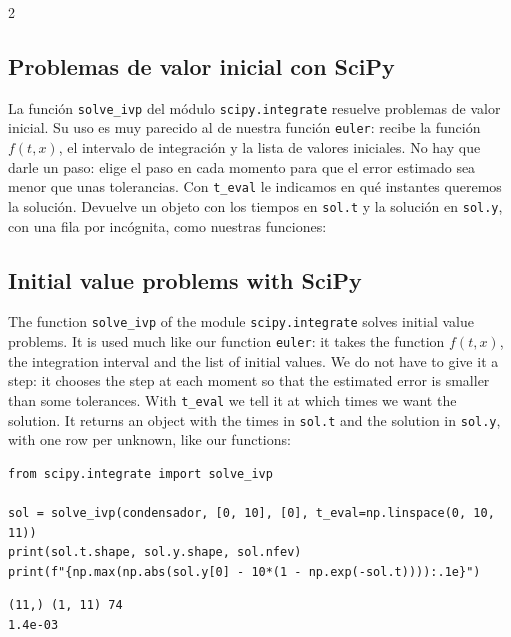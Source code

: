 \begin{paracol}{2}
\subsection{Problemas de valor inicial con SciPy}\label{sec:solve_ivp}
La función \texttt{solve_ivp} del módulo \texttt{scipy.integrate} resuelve problemas de valor inicial. Su uso es muy parecido al de nuestra función \texttt{euler}: recibe la función $f(t,x)$, el intervalo de integración y la lista de valores iniciales. No hay que darle un paso: elige el paso en cada momento para que el error estimado sea menor que unas tolerancias. Con \texttt{t_eval} le indicamos en qué instantes queremos la solución. Devuelve un objeto con los tiempos en \texttt{sol.t} y la solución en \texttt{sol.y}, con una fila por incógnita, como nuestras funciones:
\switchcolumn
\subsection{Initial value problems with SciPy}\label{sec:solve_ivp-2}
The function \texttt{solve_ivp} of the module \texttt{scipy.integrate} solves initial value problems. It is used much like our function \texttt{euler}: it takes the function $f(t,x)$, the integration interval and the list of initial values. We do not have to give it a step: it chooses the step at each moment so that the estimated error is smaller than some tolerances. With \texttt{t_eval} we tell it at which times we want the solution. It returns an object with the times in \texttt{sol.t} and the solution in \texttt{sol.y}, with one row per unknown, like our functions:
\end{paracol}
\begin{verbatim}
from scipy.integrate import solve_ivp

sol = solve_ivp(condensador, [0, 10], [0], t_eval=np.linspace(0, 10, 11))
print(sol.t.shape, sol.y.shape, sol.nfev)
print(f"{np.max(np.abs(sol.y[0] - 10*(1 - np.exp(-sol.t)))):.1e}")
\end{verbatim}
\begin{verbatim}
(11,) (1, 11) 74
1.4e-03
\end{verbatim}
